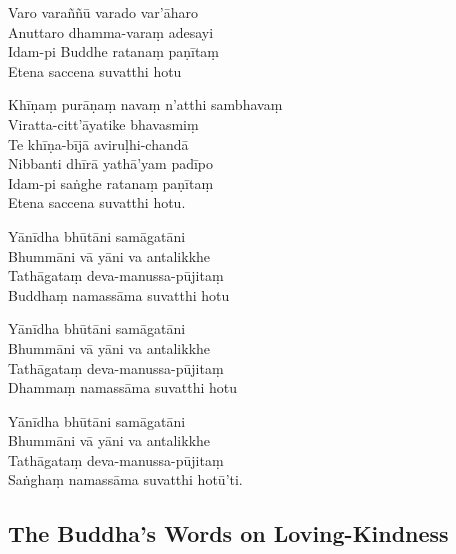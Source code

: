 \begin{paritta}
Varo varaññū varado var'āharo\\
Anuttaro dhamma-varaṃ adesayi\\
Idam-pi Buddhe ratanaṃ paṇītaṃ\\
Etena saccena suvatthi hotu

%
Khīṇaṃ purāṇaṃ navaṃ n'atthi sambhavaṃ\\
Viratta-citt'āyatike bhavasmiṃ\\
Te khīṇa-bījā aviruḷhi-chandā\\
Nibbanti dhīrā yathā'yam padīpo\\
Idam-pi saṅghe ratanaṃ paṇītaṃ\\
Etena saccena suvatthi hotu.

\enlargethispage{\baselineskip}

Yānīdha bhūtāni samāgatāni\\
Bhummāni vā yāni va antalikkhe\\
Tathāgataṃ deva-manussa-pūjitaṃ\\
Buddhaṃ namassāma suvatthi hotu

Yānīdha bhūtāni samāgatāni\\
Bhummāni vā yāni va antalikkhe\\
Tathāgataṃ deva-manussa-pūjitaṃ\\
Dhammaṃ namassāma suvatthi hotu

Yānīdha bhūtāni samāgatāni\\
Bhummāni vā yāni va antalikkhe\\
Tathāgataṃ deva-manussa-pūjitaṃ\\
Saṅghaṃ namassāma suvatthi hotū'ti. 

\end{paritta}

\subsection{The Buddha's Words on Loving-Kindness}
\label{karaniyam-attha}



